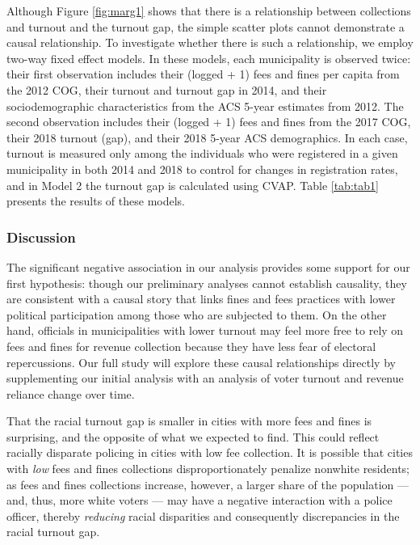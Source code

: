 \documentclass[
  12pt,
]{article}
\begin{document}
Although Figure \ref{fig:marg1} shows that there is a relationship between collections and turnout and the turnout gap, the simple scatter plots cannot demonstrate a causal relationship. To investigate whether there is such a relationship, we employ two-way fixed effect models. In these models, each municipality is observed twice: their first observation includes their (logged + 1) fees and fines per capita from the 2012 COG, their turnout and turnout gap in 2014, and their sociodemographic characteristics from the ACS 5-year estimates from 2012. The second observation includes their (logged + 1) fees and fines from the 2017 COG, their 2018 turnout (gap), and their 2018 5-year ACS demographics. In each case, turnout is measured only among the individuals who were registered in a given municipality in both 2014 and 2018 to control for changes in registration rates, and in Model 2 the turnout gap is calculated using CVAP. Table \ref{tab:tab1} presents the results of these models.

\begin{singlespace}

\end{singlespace}

\hypertarget{discussion}{%
\subsubsection*{Discussion}\label{discussion}}

The significant negative association in our analysis provides some support for our first hypothesis: though our preliminary analyses cannot establish causality, they are consistent with a causal story that links fines and fees practices with lower political participation among those who are subjected to them. On the other hand, officials in municipalities with lower turnout may feel more free to rely on fees and fines for revenue collection because they have less fear of electoral repercussions. Our full study will explore these causal relationships directly by supplementing our initial analysis with an analysis of voter turnout and revenue reliance change over time.

That the racial turnout gap is smaller in cities with more fees and fines is surprising, and the opposite of what we expected to find. This could reflect racially disparate policing in cities with low fee collection. It is possible that cities with \emph{low} fees and fines collections disproportionately penalize nonwhite residents; as fees and fines collections increase, however, a larger share of the population --- and, thus, more white voters --- may have a negative interaction with a police officer, thereby \emph{reducing} racial disparities and consequently discrepancies in the racial turnout gap.
\end{document}
